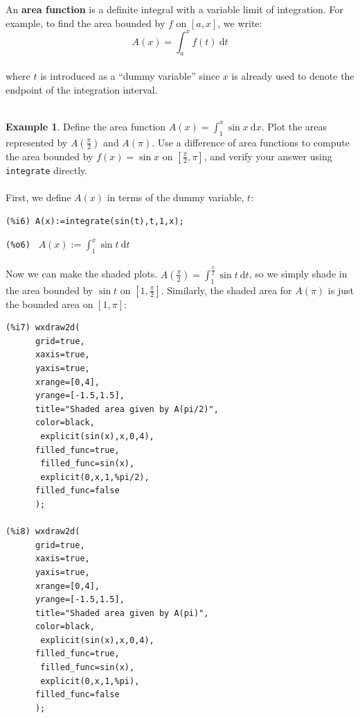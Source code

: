 \documentclass[10.5pt,twoside]{report}
\theoremstyle{definition}
\newtheorem{exmp}{Example}[section]
\begin{document}
An \textbf{area function} is a definite integral with a variable limit of integration.  For example, to find the area bounded by $f$ on $[a,x]$, we write: \[A(x)=\displaystyle \int_a^x f(t)\ \mathrm{d}t\]\\

where $t$ is introduced as a ``dummy variable'' since $x$ is already used to denote the endpoint of the integration interval.  \\

${}$\\

\begin{exmp} Define the area function $A(x)=\displaystyle \int_1^x \sin{x} \ \mathrm{d} x$.  Plot the areas represented by $A(\frac{\pi}{2})$ and $A(\pi)$.  Use a difference of area functions to compute the area bounded by $f(x)=\sin{x}$ on $[\frac{\pi}{2},\pi]$, and verify your answer using \verb|integrate| directly.\\

${}$\\

First, we define $A(x)$ in terms of the dummy variable, $t$:

\begin{verbatim}
(%i6) A(x):=integrate(sin(t),t,1,x);
\end{verbatim}
\verb|(%o6) | $A(x):=\displaystyle \int_1^x \sin{t} \ \mathrm{d}t$\\

${}$\\

Now we can make the shaded plots.  $A(\frac{\pi}{2})=\displaystyle \int_1^{\frac{\pi}{2}} \sin{t} \ \mathrm{d}t$, so we simply shade in the area bounded by $\sin{t}$ on $[1,\frac{\pi}{2}]$.  Similarly, the shaded area for $A(\pi)$ is just the bounded area on $[1,\pi]$:

\begin{verbatim}
(%i7) wxdraw2d(
      grid=true,
      xaxis=true,
      yaxis=true,
      xrange=[0,4],
      yrange=[-1.5,1.5],
      title="Shaded area given by A(pi/2)",
      color=black,
       explicit(sin(x),x,0,4),
      filled_func=true,
       filled_func=sin(x),
       explicit(0,x,1,%pi/2),
      filled_func=false
      );
 
(%i8) wxdraw2d(
      grid=true,
      xaxis=true,
      yaxis=true,
      xrange=[0,4],
      yrange=[-1.5,1.5],
      title="Shaded area given by A(pi)",
      color=black,
       explicit(sin(x),x,0,4),
      filled_func=true,
       filled_func=sin(x),
       explicit(0,x,1,%pi),
      filled_func=false
      );
\end{verbatim} 



\end{exmp}
\end{document}
